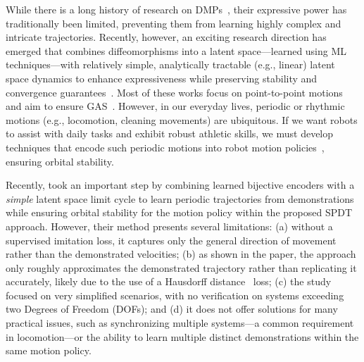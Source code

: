 While there is a long history of research on \glspl{DMP}~\citep{ijspeert2002learning, ijspeert2013dynamical, saveriano2023dynamic, hu2024fusion}, their expressive power has traditionally been limited, preventing them from learning highly complex and intricate trajectories. Recently, however, an exciting research direction has emerged that combines diffeomorphisms into a latent space—learned using ML techniques—with relatively simple, analytically tractable (e.g., linear) latent space dynamics to enhance expressiveness while preserving stability and convergence guarantees~\citep{rana2020euclideanizing, urain2020imitationflow, zhang2022learning, perez2023stable}. Most of these works focus on point-to-point motions and aim to ensure \gls{GAS}~\citep{rana2020euclideanizing, zhang2022learning, perez2023stable, perez2024puma}. However, in our everyday lives, periodic or rhythmic motions (e.g., locomotion, cleaning movements) are ubiquitous. If we want robots to assist with daily tasks and exhibit robust athletic skills, we must develop techniques that encode such periodic motions into robot motion policies~\citep{ijspeert2002learning, ijspeert2013dynamical, khadivar2021learning, abu2024learning, zhi2024teaching}, ensuring orbital stability.

Recently, \citet{zhi2024teaching} took an important step by combining learned bijective encoders with a \emph{simple} latent space limit cycle to learn periodic trajectories from demonstrations while ensuring orbital stability for the motion policy within the proposed \gls{SPDT} approach. However, their method presents several limitations: (a) without a supervised imitation loss, it captures only the general direction of movement rather than the demonstrated velocities; (b) as shown in the paper, the approach only roughly approximates the demonstrated trajectory rather than replicating it accurately, likely due to the use of a Hausdorff distance~\citep{hausdorff1914grundzuge} loss; (c) the study focused on very simplified scenarios, with no verification on systems exceeding two Degrees of Freedom (DOFs); and (d) it does not offer solutions for many practical issues, such as synchronizing multiple systems—a common requirement in locomotion—or the ability to learn multiple distinct demonstrations within the same motion policy.

